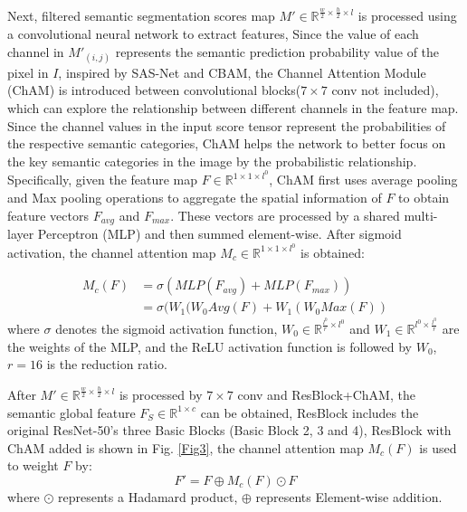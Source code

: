 \documentclass[conference]{IEEEtran}
\begin{document}
Next, filtered semantic segmentation scores map $M' \in \mathbb{R}^{\frac{w}{2} \times \frac{h}{2} \times l}$ is processed using a convolutional neural network to extract features, Since the value of each channel in ${M'_{(i,j)}}$ represents the semantic prediction probability value of the pixel in $I$, inspired by SAS-Net\cite{ref17} and CBAM\cite{ref21}, the Channel Attention Module (ChAM)\cite{ref21} is introduced between convolutional blocks($7 \times 7$ conv not included), which can explore the relationship between different channels in the feature map. Since the channel values in the input score tensor represent the probabilities of the respective semantic categories, ChAM helps the network to better focus on the key semantic categories in the image by the probabilistic relationship. Specifically, given the feature map $F \in \mathbb{R}^{1 \times 1 \times {l^0}}$, ChAM first uses average pooling and Max pooling operations to aggregate the spatial information of $F$ to obtain feature vectors $F_{avg}$ and $F_{max}$. These vectors are processed by a shared multi-layer Perceptron (MLP) and then summed element-wise. After sigmoid activation, the channel attention map  $M_c \in \mathbb{R}^{1 \times 1 \times l^0}$ is obtained:

\begin{equation}
    \begin{aligned}
    {M_c}(F)&=\sigma (MLP({F_{avg}}) + MLP({F_{max}}))\\
    &=\sigma ({W_1}({W_0}Avg(F) + {W_1}({W_0}Max(F))
    \end{aligned}
    \label{eq1}
\end{equation}
where $\sigma$ denotes the sigmoid activation function, $W_0 \in \mathbb{R}^{{\frac{l^0}{r}\times l^0 }}$ and $W_1 \in \mathbb{R}^{{l^0 \times \frac{l^0}{r}}}$ are the weights of the MLP, and the ReLU activation function is followed by $W_0$, $r=16$ is the reduction ratio.

After $M' \in \mathbb{R}^{\frac{w}{2} \times \frac{h}{2} \times l}$ is processed by $7 \times 7$ conv and ResBlock+ChAM, the semantic global feature $F_S \in \mathbb{R}^{1 \times c}$ can be obtained, ResBlock includes the original ResNet-50’s three Basic Blocks (Basic Block 2, 3 and 4), ResBlock with ChAM added is shown in Fig. \ref{Fig3}, the channel attention map $M_c(F)$ is used to weight $F$ by:
\begin{equation}
    F' = F \oplus {M_c}(F) \odot F
    \label{eq2}
\end{equation}
where $\odot $ represents a Hadamard product, $\oplus$ represents Element-wise addition.
\end{document}
